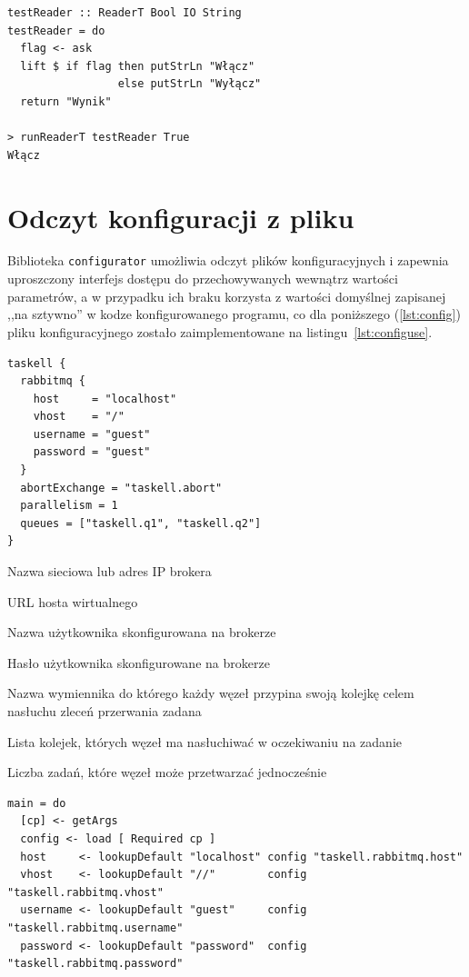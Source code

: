 \begin{lstlisting}
testReader :: ReaderT Bool IO String
testReader = do
  flag <- ask 
  lift $ if flag then putStrLn "Włącz"
                 else putStrLn "Wyłącz"
  return "Wynik"

> runReaderT testReader True
Włącz
\end{lstlisting}

\newpage
\section{Odczyt konfiguracji z pliku}
Biblioteka \texttt{configurator} \cite{Conf} umożliwia odczyt plików konfiguracyjnych i zapewnia uproszczony interfejs dostępu do przechowywanych wewnątrz wartości parametrów, a w przypadku ich braku korzysta z wartości domyślnej zapisanej ,,na sztywno'' w kodze konfigurowanego programu, co dla poniższego (\ref{lst:config}) pliku konfiguracyjnego zostało zaimplementowane na listingu~\ref{lst:configuse}.
\begin{lstlisting}[caption=Przykładowy plik konfiguracyjny, label=lst:config]
taskell {
  rabbitmq {
    host     = "localhost"
    vhost    = "/"
    username = "guest"
    password = "guest"
  }
  abortExchange = "taskell.abort"
  parallelism = 1
  queues = ["taskell.q1", "taskell.q2"]
}
\end{lstlisting}

\begin{description}[align=right,labelwidth=10cm,leftmargin=6cm]
  \item[taskell.rabbitmq.host] Nazwa sieciowa lub adres IP brokera
  \item[taskell.rabbitmq.vhost] URL hosta wirtualnego
  \item[taskell.rabbitmq.username] Nazwa użytkownika skonfigurowana na brokerze
  \item[taskell.rabbitmq.password] Hasło użytkownika skonfigurowane na brokerze
  \item[taskell.abortExchange] Nazwa wymiennika do którego każdy węzeł przypina swoją kolejkę celem nasłuchu zleceń przerwania zadana
  \item[taskell.queues] Lista kolejek, których węzeł ma nasłuchiwać w oczekiwaniu na zadanie
  \item[taskell.parallelism] Liczba zadań, które węzeł może przetwarzać jednocześnie
\end{description}
\begin{lstlisting}[caption=Odczyt konfiguracji, label=lst:configuse]
main = do
  [cp] <- getArgs
  config <- load [ Required cp ]
  host     <- lookupDefault "localhost" config "taskell.rabbitmq.host"
  vhost    <- lookupDefault "//"        config "taskell.rabbitmq.vhost"
  username <- lookupDefault "guest"     config "taskell.rabbitmq.username"
  password <- lookupDefault "password"  config "taskell.rabbitmq.password"
\end{lstlisting}
\newpage

